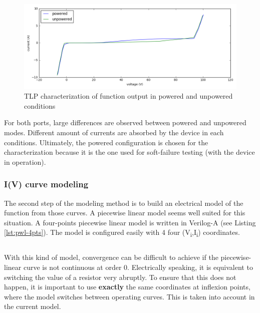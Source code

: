 \begin{figure}[!h]
  \centering
  \includegraphics[width=\textwidth]{src/4/figures/tlp_output_characterization.png}
  \caption{TLP characterization of function output in powered and unpowered conditions}
  \label{fig:tlp-output-cz}
\end{figure}

For both ports, large differences are observed between powered and unpowered modes.
Different amount of currents are absorbed by the device in each conditions.
Ultimately, the powered configuration is chosen for the characterization because it is the one used for soft-failure testing (with the device in operation).

\subsubsection{I(V) curve modeling}

The second step of the modeling method is to build an electrical model of the function from those curves.
A piecewise linear model seems well suited for this situation.
A four-points piecewise linear model is written in Verilog-A (see Listing \ref{lst:pwl-4pts}).
The model is configured easily with 4 four (V\textsubscript{i},I\textsubscript{i}) coordinates.

\begin{code}
\inputminted[frame=single]{verilog}{src/4/snippets/pwl_4pts.va}
\caption{Piecewise linear 4-points Verilog-A model}
\label{lst:pwl-4pts}
\end{code}

With this kind of model, convergence can be difficult to achieve if the piecewise-linear curve is not continuous at order 0.
Electrically speaking, it is equivalent to switching the value of a resistor very abruptly.
To ensure that this does not happen, it is important to use \textbf{exactly} the same coordinates at inflexion points, where the model switches between operating curves.
This is taken into account in the current model.

